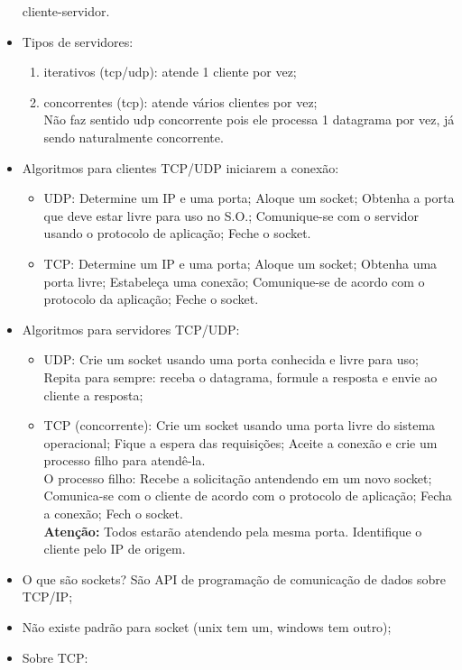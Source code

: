 \documentclass{article}
\begin{document}
\begin{itemize}
cliente-servidor.
   \item Tipos de servidores:
      \begin{enumerate}
         \item iterativos (tcp/udp): atende 1 cliente por vez;
         \item concorrentes (tcp): atende vários clientes por vez;
         \\Não faz sentido udp concorrente pois ele processa 1 datagrama por vez, já sendo
naturalmente concorrente.
      \end{enumerate}
   \item Algoritmos para clientes TCP/UDP iniciarem a conexão:
      \begin{itemize}
         \item UDP: Determine um IP e uma porta; Aloque um socket; Obtenha a porta que deve estar
livre para uso no S.O.; Comunique-se com o servidor usando o protocolo de aplicação; Feche o socket.
         \item TCP: Determine um IP e uma porta; Aloque um socket; Obtenha uma porta livre;
Estabeleça uma conexão; Comunique-se de acordo com o protocolo da aplicação; Feche o socket.
      \end{itemize}
   \item Algoritmos para servidores TCP/UDP:
         \begin{itemize}
            \item UDP: Crie um socket usando uma porta conhecida e livre para uso; Repita para
sempre: receba o datagrama, formule a resposta e envie ao cliente a resposta;
            \item TCP (concorrente): Crie um socket usando uma porta livre do sistema operacional;
Fique a espera das requisições; Aceite a conexão e crie um processo filho para atendê-la.\\
            O processo filho: Recebe a solicitação antendendo em um novo socket; Comunica-se com o
cliente de acordo com o protocolo de aplicação; Fecha a conexão; Fech o socket.\\
            \textbf{Atenção:} Todos estarão atendendo pela mesma porta. Identifique o cliente pelo
IP de origem.
         \end{itemize}
   \item O que são sockets? São API de programação de comunicação de dados sobre TCP/IP;
   \item Não existe padrão para socket (unix tem um, windows tem outro);
   \item Sobre TCP:

\end{itemize}
\end{document}

